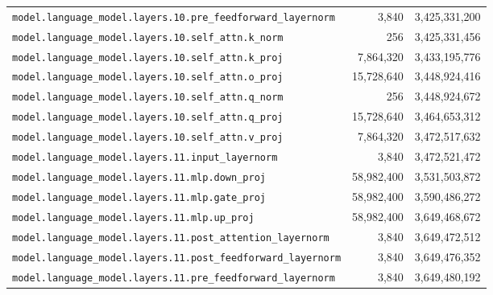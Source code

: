 \documentclass[10pt,a4paper]{article}
\theoremstyle{definition}
\begin{document}
\begin{appendices}
\begin{longtable}{p{9.5cm}rr}
\texttt{model.\allowbreak{}language\_model.\allowbreak{}layers.\allowbreak{}10.\allowbreak{}pre\_feedforward\_layernorm} & 3,840 & 3,425,331,200 \\
\texttt{model.\allowbreak{}language\_model.\allowbreak{}layers.\allowbreak{}10.\allowbreak{}self\_attn.\allowbreak{}k\_norm} & 256 & 3,425,331,456 \\
\texttt{model.\allowbreak{}language\_model.\allowbreak{}layers.\allowbreak{}10.\allowbreak{}self\_attn.\allowbreak{}k\_proj} & 7,864,320 & 3,433,195,776 \\
\texttt{model.\allowbreak{}language\_model.\allowbreak{}layers.\allowbreak{}10.\allowbreak{}self\_attn.\allowbreak{}o\_proj} & 15,728,640 & 3,448,924,416 \\
\texttt{model.\allowbreak{}language\_model.\allowbreak{}layers.\allowbreak{}10.\allowbreak{}self\_attn.\allowbreak{}q\_norm} & 256 & 3,448,924,672 \\
\texttt{model.\allowbreak{}language\_model.\allowbreak{}layers.\allowbreak{}10.\allowbreak{}self\_attn.\allowbreak{}q\_proj} & 15,728,640 & 3,464,653,312 \\
\texttt{model.\allowbreak{}language\_model.\allowbreak{}layers.\allowbreak{}10.\allowbreak{}self\_attn.\allowbreak{}v\_proj} & 7,864,320 & 3,472,517,632 \\
\texttt{model.\allowbreak{}language\_model.\allowbreak{}layers.\allowbreak{}11.\allowbreak{}input\_layernorm} & 3,840 & 3,472,521,472 \\
\texttt{model.\allowbreak{}language\_model.\allowbreak{}layers.\allowbreak{}11.\allowbreak{}mlp.\allowbreak{}down\_proj} & 58,982,400 & 3,531,503,872 \\
\texttt{model.\allowbreak{}language\_model.\allowbreak{}layers.\allowbreak{}11.\allowbreak{}mlp.\allowbreak{}gate\_proj} & 58,982,400 & 3,590,486,272 \\
\texttt{model.\allowbreak{}language\_model.\allowbreak{}layers.\allowbreak{}11.\allowbreak{}mlp.\allowbreak{}up\_proj} & 58,982,400 & 3,649,468,672 \\
\texttt{model.\allowbreak{}language\_model.\allowbreak{}layers.\allowbreak{}11.\allowbreak{}post\_attention\_layernorm} & 3,840 & 3,649,472,512 \\
\texttt{model.\allowbreak{}language\_model.\allowbreak{}layers.\allowbreak{}11.\allowbreak{}post\_feedforward\_layernorm} & 3,840 & 3,649,476,352 \\
\texttt{model.\allowbreak{}language\_model.\allowbreak{}layers.\allowbreak{}11.\allowbreak{}pre\_feedforward\_layernorm} & 3,840 & 3,649,480,192 \\

\end{longtable}
\end{appendices}
\end{document}
